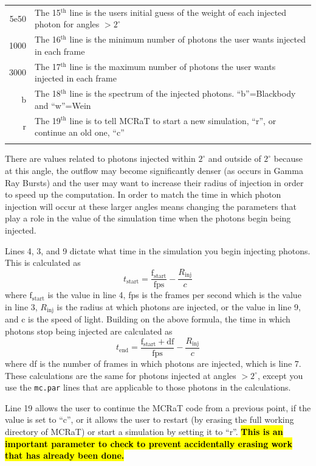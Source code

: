 \documentclass[12pt,a4paper]{article}
\begin{document}
\begin{tabularx}{\linewidth}{r X}
5e50 &    The 15$^\textrm{th}$ line is the users initial guess of the weight of each injected photon for angles $> 2^\circ$\\ 
1000 &   The 16$^\textrm{th}$ line is the minimum number of photons the user wants injected in each frame \\ 
3000 &    The 17$^\textrm{th}$ line is the maximum number of photons the user wants injected in each frame\\ 
b &   The 18$^\textrm{th}$ line is the spectrum of the injected photons. ``b''=Blackbody and ``w''=Wein \\ 
r &    The 19$^\textrm{th}$ line is to tell MCRaT to start a new simulation, ``r'', or continue an old one, ``c'' \\ \newline
\end{tabularx} 

There are values related to photons injected within $2^\circ$ and outside of $2^\circ$ because at this angle, the outflow may become significantly denser (as occurs in Gamma Ray Bursts) and the user may want to increase their radius of injection in order to speed up the computation. In order to match the time in which photon injection will occur at these larger angles means changing the parameters that play a role in the value of the simulation time when the photons begin being injected. 

Lines 4, 3, and  9 dictate what time in the simulation you begin injecting photons. This is calculated as 
\[
t_\mathrm{start}=\frac{\mathrm{f_{start}}}{\mathrm{fps}}-\frac{R_\mathrm{inj}}{c}
\]
where $\mathrm{f_{start}}$ is the value in line 4, fps is the frames per second which is the value in line 3, $R_\mathrm{inj}$ is the radius at which photons are injected, or the value in line 9, and c is the speed of light. Building on the above formula, the time in which photons stop being injected are calculated as
\[
t_\mathrm{end}=\frac{\mathrm{f_{start}}+\mathrm{df}}{\mathrm{fps}}-\frac{R_\mathrm{inj}}{c}
\]
where df is the number of frames in which photons are injected, which is line 7. These calculations are the same for photons injected at angles $> 2^\circ$, except you use the \texttt{mc.par} lines that are applicable to those photons in the calculations. 

Line 19 allows the user to continue the MCRaT code from a previous point, if the value is set to ``c'', or it allows the user to restart (by erasing the full working directory of MCRaT) or start a simulation by setting it to ``r''. \hl{\bf This is an important parameter to check to prevent accidentally erasing work that has already been done.}
\end{document}
